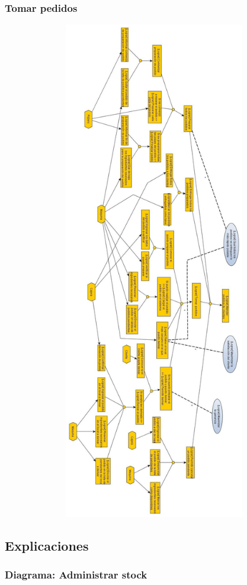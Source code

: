 \documentclass[a4paper,11pt] {article}
\begin{document}
\subsubsection*{Tomar pedidos}
\begin{center}
 \includegraphics[height=22cm,width=15cm]{Diagramas/TomarPedido.jpg}
\end{center}

\subsection*{Explicaciones}

\subsubsection*{Diagrama: Administrar stock}
\end{document}
